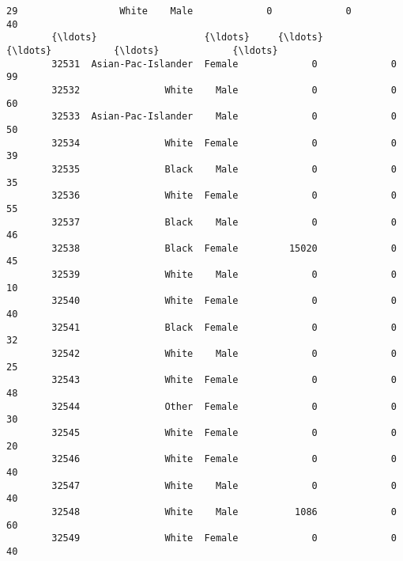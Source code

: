 \documentclass[11pt]{article}
\begin{document}
\begin{Verbatim}[commandchars=\\\{\}]
        29                  White    Male             0             0              40   
        {\ldots}                   {\ldots}     {\ldots}           {\ldots}           {\ldots}             {\ldots}   
        32531  Asian-Pac-Islander  Female             0             0              99   
        32532               White    Male             0             0              60   
        32533  Asian-Pac-Islander    Male             0             0              50   
        32534               White  Female             0             0              39   
        32535               Black    Male             0             0              35   
        32536               White  Female             0             0              55   
        32537               Black    Male             0             0              46   
        32538               Black  Female         15020             0              45   
        32539               White    Male             0             0              10   
        32540               White  Female             0             0              40   
        32541               Black  Female             0             0              32   
        32542               White    Male             0             0              25   
        32543               White  Female             0             0              48   
        32544               Other  Female             0             0              30   
        32545               White  Female             0             0              20   
        32546               White  Female             0             0              40   
        32547               White    Male             0             0              40   
        32548               White    Male          1086             0              60   
        32549               White  Female             0             0              40   
        32550               White    Male             0             0              50   
        32551  Amer-Indian-Eskimo    Male             0             0              40   
        32552               White    Male             0             0              45   
        32553  Asian-Pac-Islander    Male             0             0              11   
        32554               White    Male             0             0              40   
        32555               White    Male             0             0              40   
        32556               White  Female             0             0              38   
        32557               White    Male             0             0              40   
        32558               White  Female             0             0              40   
        32559               White    Male             0             0              20   
        32560               White  Female         15024             0              40   
        

\end{Verbatim}
\end{document}
